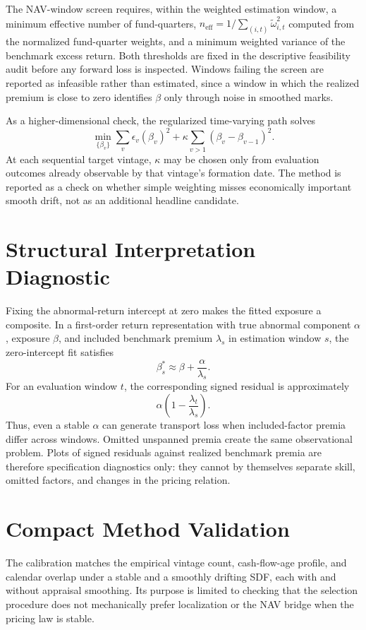 \documentclass[11pt]{article}
\begin{document}
The NAV-window screen requires, within the weighted estimation window, a
minimum effective number of fund-quarters,
$n_{\mathrm{eff}}=1/\sum_{(i,t)}\widetilde\omega_{i,t}^2$ computed from the
normalized fund-quarter weights, and a minimum weighted variance of the
benchmark excess return. Both thresholds are fixed in the descriptive
feasibility audit before any forward loss is inspected. Windows failing the
screen are reported as infeasible rather than estimated, since a window in
which the realized premium is close to zero identifies $\beta$ only through
noise in smoothed marks.

As a higher-dimensional check, the regularized time-varying path solves
\[
\min_{\{\beta_v\}}
\sum_v\epsilon_v(\beta_v)^2
+\kappa\sum_{v>1}(\beta_v-\beta_{v-1})^2.
\]
At each sequential target vintage, $\kappa$ may be chosen only from evaluation
outcomes already observable by that vintage's formation date. The method is
reported as a check on whether simple weighting misses economically important
smooth drift, not as an additional headline candidate.

\section{Structural Interpretation Diagnostic}
\label{app:structural}

Fixing the abnormal-return intercept at zero makes the fitted exposure a
composite. In a first-order return representation with true abnormal component
$\alpha$, exposure $\beta$, and included benchmark premium $\lambda_s$ in
estimation window $s$, the zero-intercept fit satisfies
\[
\beta_s^*\approx\beta+\frac{\alpha}{\lambda_s}.
\]
For an evaluation window $t$, the corresponding signed residual is
approximately
\[
\alpha\left(1-\frac{\lambda_t}{\lambda_s}\right).
\]
Thus, even a stable $\alpha$ can generate transport loss when included-factor
premia differ across windows. Omitted unspanned premia create the same
observational problem. Plots of signed residuals against realized benchmark
premia are therefore specification diagnostics only: they cannot by themselves
separate skill, omitted factors, and changes in the pricing relation.

\section{Compact Method Validation}

The calibration matches the empirical vintage count, cash-flow-age profile,
and calendar overlap under a stable and a smoothly drifting SDF, each with and
without appraisal smoothing. Its purpose is limited to checking that the
selection procedure does not mechanically prefer localization or the NAV
bridge when the pricing law is stable.



\end{document}
